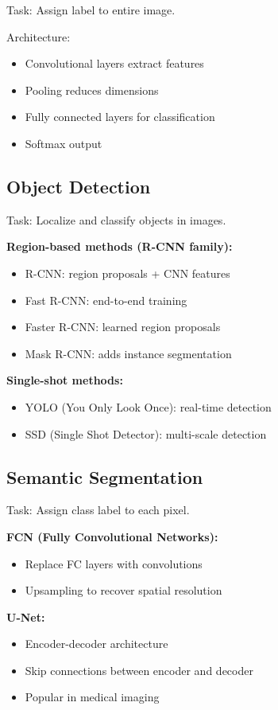 Task: Assign label to entire image.

Architecture:
\begin{itemize}
    \item Convolutional layers extract features
    \item Pooling reduces dimensions
    \item Fully connected layers for classification
    \item Softmax output
\end{itemize}

\subsection{Object Detection}

Task: Localize and classify objects in images.

\textbf{Region-based methods (R-CNN family):}
\begin{itemize}
    \item R-CNN: region proposals + CNN features
    \item Fast R-CNN: end-to-end training
    \item Faster R-CNN: learned region proposals
    \item Mask R-CNN: adds instance segmentation
\end{itemize}

\textbf{Single-shot methods:}
\begin{itemize}
    \item YOLO (You Only Look Once): real-time detection
    \item SSD (Single Shot Detector): multi-scale detection
\end{itemize}

\subsection{Semantic Segmentation}

Task: Assign class label to each pixel.

\textbf{FCN (Fully Convolutional Networks):}
\begin{itemize}
    \item Replace FC layers with convolutions
    \item Upsampling to recover spatial resolution
\end{itemize}

\textbf{U-Net:}
\begin{itemize}
    \item Encoder-decoder architecture
    \item Skip connections between encoder and decoder
    \item Popular in medical imaging
\end{itemize}

